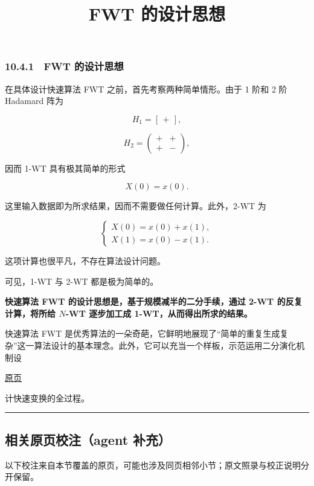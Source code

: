 \documentclass[
  10pt,
  fontset=fandol]{ctexart}
\title{FWT 的设计思想}
\author{}
\date{}
\begin{document}
\maketitle

\subsubsection{10.4.1　FWT 的设计思想}\label{fwt-ux7684ux8bbeux8ba1ux601dux60f3}

在具体设计快速算法 FWT 之前，首先考察两种简单情形。由于 1 阶和 2 阶 Hadamard 阵为

\[
H_1=[\,+\,],
\]

\[
H_2=\begin{pmatrix}+&+\\+&-\end{pmatrix},
\]

因而 1-WT 具有极其简单的形式

\[
X(0)=x(0).
\]

这里输入数据即为所求结果，因而不需要做任何计算。此外，2-WT 为

\[
\begin{cases}
X(0)=x(0)+x(1),\\
X(1)=x(0)-x(1).
\end{cases}
\]

这项计算也很平凡，不存在算法设计问题。

可见，1-WT 与 2-WT 都是极为简单的。

\textbf{快速算法 FWT 的设计思想是，基于规模减半的二分手续，通过 2-WT 的反复计算，将所给 \(N\)-WT 逐步加工成 1-WT，从而得出所求的结果。}

快速算法 FWT 是优秀算法的一朵奇葩，它鲜明地展现了``简单的重复生成复杂''这一算法设计的基本理念。此外，它可以充当一个样板，示范运用二分演化机制设

\href{../../source-images/pdf-271.jpeg}{原页}

计快速变换的全过程。

\begin{center}\rule{0.5\linewidth}{0.5pt}\end{center}

\subsection{相关原页校注（agent 补充）}\label{ux76f8ux5173ux539fux9875ux6821ux6ce8agent-ux8865ux5145}

以下校注来自本节覆盖的原页，可能也涉及同页相邻小节；原文照录与校正说明分开保留。
\end{document}
